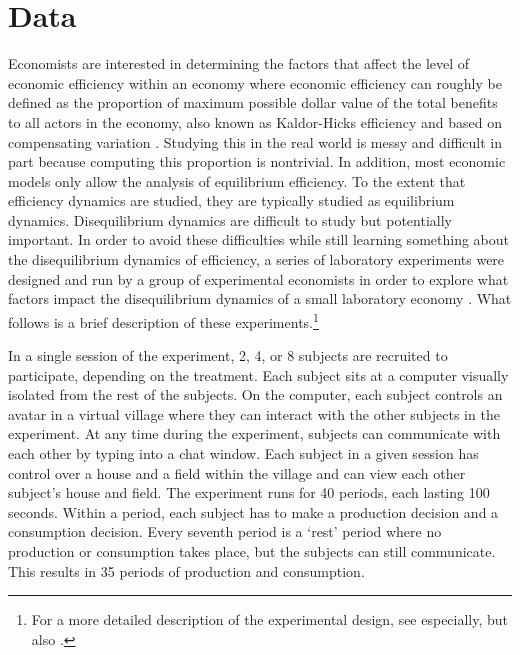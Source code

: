 \documentclass[graybox]{svmult}
\begin{document}
\section{Data}\label{sec:data}
Economists are interested in determining the factors that affect the level of economic efficiency within an economy where economic efficiency can roughly be defined as the proportion of maximum possible dollar value of the total benefits to all actors in the economy, also known as Kaldor-Hicks efficiency and based on compensating variation \citep{kaldor1939welfare,mas1995microeconomic}. Studying this in the real world is messy and difficult in part because computing this proportion is nontrivial. In addition, most economic models only allow the analysis of equilibrium efficiency. To the extent that efficiency dynamics are studied, they are typically studied as equilibrium dynamics. Disequilibrium dynamics are difficult to study but potentially important. In order to avoid these difficulties while still learning something about the disequilibrium dynamics of efficiency, a series of laboratory experiments were designed and run by a group of experimental economists in order to explore what factors impact the disequilibrium dynamics of a small laboratory economy \citep{crockett2009exchange,kimbrough2010exchange}. What follows is a brief description of these experiments.\footnote{For a more detailed description of the experimental design, see \cite{crockett2009exchange} especially, but also \cite{kimbrough2010exchange}.}

In a single session of the experiment, 2, 4, or 8 subjects are recruited to participate, depending on the treatment. Each subject sits at a computer visually isolated from the rest of the subjects.  On the computer, each subject controls an avatar in a virtual village where they can interact with the other subjects in the experiment.  At any time during the experiment, subjects can communicate with each other by typing into a chat window. Each subject in a given session has control over a house and a field within the village and can view each other subject's house and field.  The experiment runs for 40 periods, each lasting 100 seconds.  Within a period, each subject has to make a production decision and a consumption decision.  Every seventh period is a `rest' period where no production or consumption takes place, but the subjects can still communicate.  This results in 35 periods of production and consumption.
\end{document}
